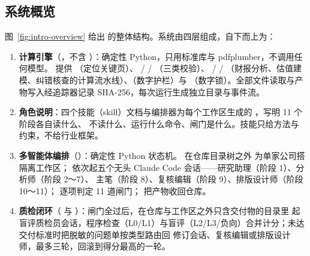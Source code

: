 \subsection{系统概览}
\label{sec:intro-overview}

图~\ref{fig:intro-overview} 给出 \sysname{} 的整体结构。系统由四层组成，自下而上为：

\begin{enumerate}
  \item \textbf{计算引擎}（，不含 ）：确定性 Python，只用标准库与 pdfplumber，不调用任何模型。
        提供 （定位关键页）、 /  / （三类校验）、
         /  / （财报分析、估值建模、纠错核查的计算流水线）、（数字护栏）与
        （数字锁）。全部文件读取与产物写入经追踪器记录 SHA-256，每次运行生成独立目录与事件流。
  \item \textbf{角色说明}：四个技能（skill）文档与编排器为每个工作区生成的 ，写明 11 个阶段各自读什么、
        不读什么、运行什么命令、闸门是什么。技能只给方法与约束，不给行业框架。
  \item \textbf{多智能体编排}（）：确定性 Python 状态机。 在仓库目录树之外
        为单家公司搭隔离工作区； 依次起五个无头 Claude Code 会话——研究助理（阶段 1）、分析师（阶段 2～7）、
        主笔（阶段 8）、复核编辑（阶段 9）、排版设计师（阶段 10～11）； 逐项判定 11 道闸门；
         把产物收回仓库。
  \item \textbf{质检闭环}（ 与 ）：闸门全过后，在仓库与工作区之外只含交付物的目录里
        起盲评质检员会话，程序检查（L0/L1）与盲评（L2/L3/负向）合并计分；未达交付标准时把脱敏的问题单按类型路由回
        修订会话、复核编辑或排版设计师，最多三轮，回滚到得分最高的一轮。
\end{enumerate}

